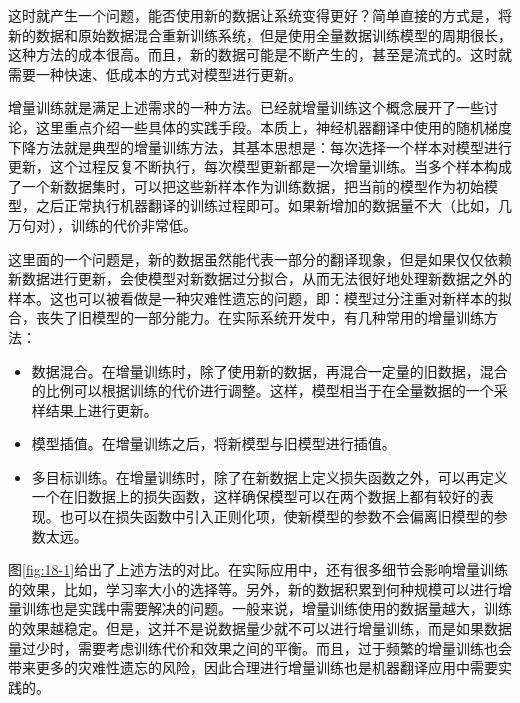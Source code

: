 \parinterval 这时就产生一个问题，能否使用新的数据让系统变得更好？简单直接的方式是，将新的数据和原始数据混合重新训练系统，但是使用全量数据训练模型的周期很长，这种方法的成本很高。而且，新的数据可能是不断产生的，甚至是流式的。这时就需要一种快速、低成本的方式对模型进行更新。

\parinterval 增量训练就是满足上述需求的一种方法。{\chapterthirteen}已经就增量训练这个概念展开了一些讨论，这里重点介绍一些具体的实践手段。本质上，神经机器翻译中使用的随机梯度下降方法就是典型的增量训练方法，其基本思想是：每次选择一个样本对模型进行更新，这个过程反复不断执行，每次模型更新都是一次增量训练。当多个样本构成了一个新数据集时，可以把这些新样本作为训练数据，把当前的模型作为初始模型，之后正常执行机器翻译的训练过程即可。如果新增加的数据量不大（比如，几万句对），训练的代价非常低。

\parinterval 这里面的一个问题是，新的数据虽然能代表一部分的翻译现象，但是如果仅仅依赖新数据进行更新，会使模型对新数据过分拟合，从而无法很好地处理新数据之外的样本。这也可以被看做是一种灾难性遗忘的问题，即：模型过分注重对新样本的拟合，丧失了旧模型的一部分能力。在实际系统开发中，有几种常用的增量训练方法：

\begin{itemize}
\vspace{0.5em}
\item 数据混合。在增量训练时，除了使用新的数据，再混合一定量的旧数据，混合的比例可以根据训练的代价进行调整。这样，模型相当于在全量数据的一个采样结果上进行更新。

\vspace{0.5em}
\item 模型插值。在增量训练之后，将新模型与旧模型进行插值。

\vspace{0.5em}
\item 多目标训练。在增量训练时，除了在新数据上定义损失函数之外，可以再定义一个在旧数据上的损失函数，这样确保模型可以在两个数据上都有较好的表现。也可以在损失函数中引入正则化项，使新模型的参数不会偏离旧模型的参数太远。

\vspace{0.5em}
\end{itemize}

\parinterval 图\ref{fig:18-1}给出了上述方法的对比。在实际应用中，还有很多细节会影响增量训练的效果，比如，学习率大小的选择等。另外，新的数据积累到何种规模可以进行增量训练也是实践中需要解决的问题。一般来说，增量训练使用的数据量越大，训练的效果越稳定。但是，这并不是说数据量少就不可以进行增量训练，而是如果数据量过少时，需要考虑训练代价和效果之间的平衡。而且，过于频繁的增量训练也会带来更多的灾难性遗忘的风险，因此合理进行增量训练也是机器翻译应用中需要实践的。

